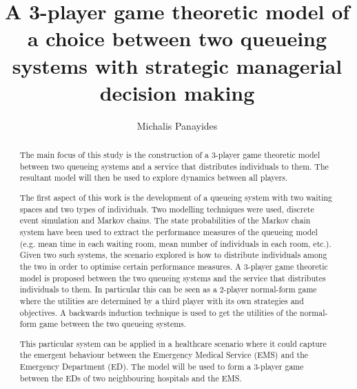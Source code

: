 \documentclass{article}
\title{A 3-player game theoretic model of a choice between two queueing systems with strategic managerial decision making}
\author{Michalis Panayides}
\begin{document}
\maketitle
\begin{abstract}

    The main focus of this study is the construction of a 3-player game 
    theoretic model between two queueing systems and a service that distributes 
    individuals to them. 
    The resultant model will then be used to explore dynamics between all 
    players.

    The first aspect of this work is the development of a queueing system
    with two waiting spaces and two types of individuals. 
    Two modelling techniques were used, discrete event 
    simulation and Markov chains. 
    The state probabilities of the Markov chain system have been used to extract
    the performance measures of the queueing model (e.g. mean time in each 
    waiting room, mean number of individuals in each room, etc.).
    Given two such systems, the scenario explored is
    how to distribute individuals among the two in order to optimise certain
    performance measures. 
    A 3-player game theoretic model is proposed between the two
    queueing systems and the service that distributes individuals to them. 
    In particular this can be seen as a 2-player normal-form game where the 
    utilities are determined by a third player with its own strategies and 
    objectives. 
    A backwards induction technique is used to get the utilities of the 
    normal-form game between the two queueing systems.

    This particular system can be applied in a healthcare scenario where it 
    could capture the emergent behaviour between the Emergency Medical Service 
    (EMS) and the Emergency Department (ED). 
    The model will be used to form a 3-player game between the EDs of two 
    neighbouring hospitals and the EMS.
    
\end{abstract}
    
\end{document}
